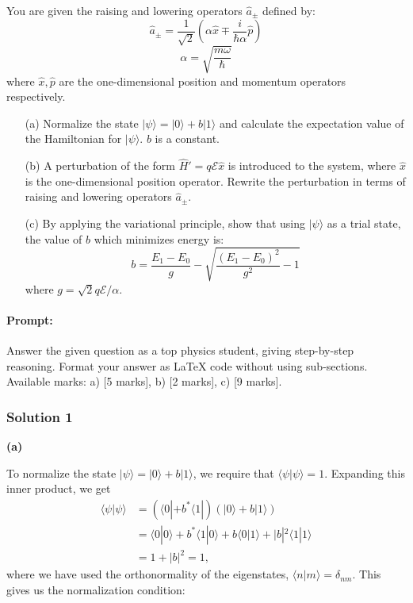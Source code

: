 \documentclass{article}
\begin{document}
You are given the raising and lowering operators \(\hat{a}_\pm\) defined by:
\[
\hat{a}_\pm = \frac{1}{\sqrt{2}} \left(\alpha \hat{x} \mp \frac{i}{\hbar \alpha} \hat{p}\right)
\]
\[
\alpha = \sqrt{\frac{m\omega}{\hbar}}
\]
where \(\hat{x}, \hat{p}\) are the one-dimensional position and momentum operators respectively.

\begin{enumerate}
    \item[(a)] Normalize the state \(|\psi\rangle = |0\rangle + b |1\rangle\) and calculate the expectation value of the Hamiltonian for \(|\psi\rangle\). \(b\) is a constant.
    
    \item[(b)] A perturbation of the form \(\hat{H}' = q \mathcal{E} \hat{x}\) is introduced to the system, where \(\hat{x}\) is the one-dimensional position operator. Rewrite the perturbation in terms of raising and lowering operators \(\hat{a}_\pm\).
    
    \item[(c)] By applying the variational principle, show that using \(|\psi\rangle\) as a trial state, the value of \(b\) which minimizes energy is:
    \[
    b = \frac{E_1 - E_0}{g} - \sqrt{\frac{(E_1 - E_0)^2}{g^2} - 1}
    \]
    where \(g = \sqrt{2}q\mathcal{E}/\alpha\).
\end{enumerate}


\paragraph{Prompt: \\} 
Answer the given question as a top physics student, giving step-by-step reasoning. Format your answer as LaTeX code without using sub-sections. Available marks: a) [5 marks], b) [2 marks], c) [9 marks].


\subsubsection{Solution 1}
\textbf{(a)} 

To normalize the state \(|\psi\rangle = |0\rangle + b |1\rangle\), we require that \(\langle \psi | \psi \rangle = 1\). Expanding this inner product, we get
\begin{align*}
\langle \psi | \psi \rangle &= (\langle 0 | + b^* \langle 1 |)(|0\rangle + b |1\rangle) \\
&= \langle 0 | 0 \rangle + b^* \langle 1 | 0 \rangle + b \langle 0 | 1 \rangle + |b|^2 \langle 1 | 1 \rangle \\
&= 1 + |b|^2 = 1,
\end{align*}
where we have used the orthonormality of the eigenstates, \(\langle n | m \rangle = \delta_{nm}\).  This gives us the normalization condition:
\end{document}
